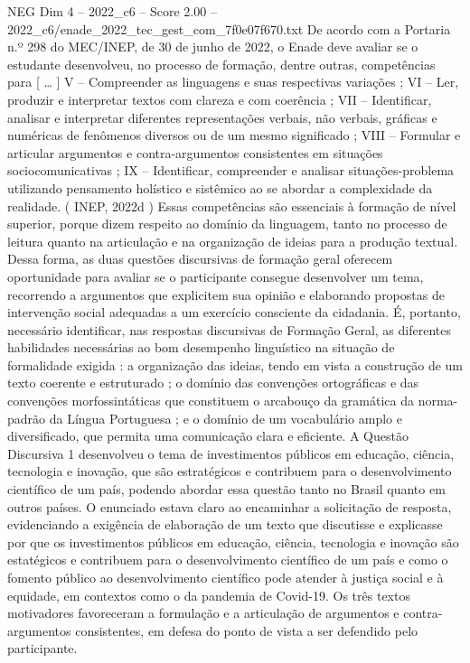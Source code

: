 \begin{textsample}{NEG Dim 4 – 2022\_c6 – Score 2.00 – 2022\_c6/enade\_2022\_tec\_gest\_com\_7f0e07f670.txt}
De acordo com a Portaria n.º 298 do MEC/INEP, de 30 de junho de 2022, o Enade deve avaliar se o estudante desenvolveu, no processo de formação, dentre outras, competências para [ … ] V – Compreender as linguagens e suas respectivas variações ; VI – Ler, produzir e interpretar textos com clareza e com coerência ; VII – Identificar, analisar e interpretar diferentes representações verbais, não verbais, gráficas e numéricas de fenômenos diversos ou de um mesmo significado ; VIII – Formular e articular argumentos e contra-argumentos consistentes em situações sociocomunicativas ; IX – Identificar, compreender e analisar situações-problema utilizando pensamento holístico e sistêmico ao se abordar a complexidade da realidade. ( INEP, 2022d ) Essas competências são essenciais à formação de nível superior, porque dizem respeito ao domínio da linguagem, tanto no processo de leitura quanto na articulação e na organização de ideias para a produção textual.
Dessa forma, as duas questões discursivas de formação geral oferecem oportunidade para avaliar se o participante consegue desenvolver um tema, recorrendo a argumentos que explicitem sua opinião e elaborando propostas de intervenção social adequadas a um exercício consciente da cidadania.
É, portanto, necessário identificar, nas respostas discursivas de Formação Geral, as diferentes habilidades necessárias ao bom desempenho linguístico na situação de formalidade exigida : a organização das ideias, tendo em vista a construção de um texto coerente e estruturado ; o domínio das convenções ortográficas e das convenções morfossintáticas que constituem o arcabouço da gramática da norma-padrão da Língua Portuguesa ; e o domínio de um vocabulário amplo e diversificado, que permita uma comunicação clara e eficiente.
A Questão Discursiva 1 desenvolveu o tema de investimentos públicos em educação, ciência, tecnologia e inovação, que são estratégicos e contribuem para o desenvolvimento científico de um país, podendo abordar essa questão tanto no Brasil quanto em outros países.
O enunciado estava claro ao encaminhar a solicitação de resposta, evidenciando a exigência de elaboração de um texto que discutisse e explicasse por que os investimentos públicos em educação, ciência, tecnologia e inovação são estatégicos e contribuem para o desenvolvimento científico de um país e como o fomento público ao desenvolvimento científico pode atender à justiça social e à equidade, em contextos como o da pandemia de Covid-19.
Os três textos motivadores favoreceram a formulação e a articulação de argumentos e contra-argumentos consistentes, em defesa do ponto de vista a ser defendido pelo participante.

\end{textsample}
